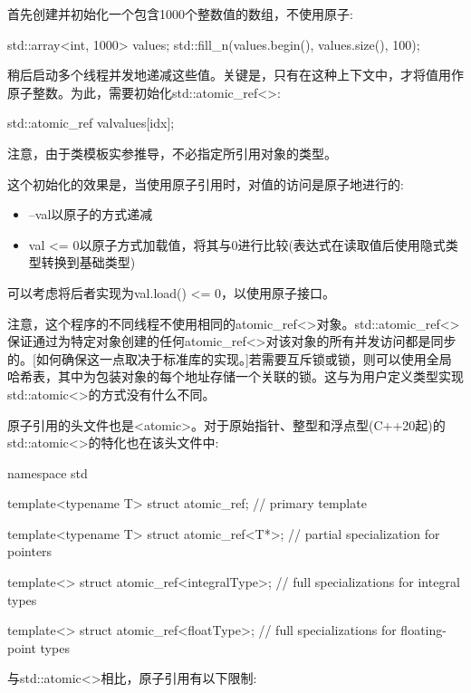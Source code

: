 首先创建并初始化一个包含1000个整数值的数组，不使用原子:

\begin{cpp}
std::array<int, 1000> values;
std::fill_n(values.begin(), values.size(), 100);
\end{cpp}

稍后启动多个线程并发地递减这些值。关键是，只有在这种上下文中，才将值用作原子整数。为此，需要初始化std::atomic\_ref<>:

\begin{cpp}
std::atomic_ref val{values[idx]};
\end{cpp}

注意，由于类模板实参推导，不必指定所引用对象的类型。

这个初始化的效果是，当使用原子引用时，对值的访问是原子地进行的:

\begin{itemize}
\item 
--val以原子的方式递减

\item 
val <= 0以原子方式加载值，将其与0进行比较(表达式在读取值后使用隐式类型转换到基础类型)
\end{itemize}

可以考虑将后者实现为val.load() <= 0，以使用原子接口。

注意，这个程序的不同线程不使用相同的atomic\_ref<>对象。std::atomic\_ref<>保证通过为特定对象创建的任何atomic\_ref<>对该对象的所有并发访问都是同步的。[如何确保这一点取决于标准库的实现。]若需要互斥锁或锁，则可以使用全局哈希表，其中为包装对象的每个地址存储一个关联的锁。这与为用户定义类型实现std::atomic<>的方式没有什么不同。


原子引用的头文件也是<atomic>。对于原始指针、整型和浮点型(C++20起)的std::atomic<>的特化也在该头文件中:

\begin{cpp}
namespace std {
	template<typename T> struct atomic_ref; // primary template
	
	template<typename T> struct atomic_ref<T*>; // partial specialization for pointers
	
	template<> struct atomic_ref<integralType>; // full specializations for integral types
	
	template<> struct atomic_ref<floatType>; // full specializations for floating-point types
}
\end{cpp}

与std::atomic<>相比，原子引用有以下限制:

